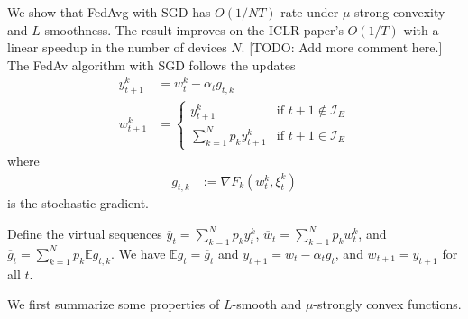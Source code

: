 We show that FedAvg with SGD has $O(1/NT)$ rate under $\mu$-strong
convexity and $L$-smoothness. The result improves on the ICLR paper's
$O(1/T)$ with a linear speedup in the number of devices $N$. {[}TODO:
Add more comment here.{]} The FedAv algorithm with SGD follows the
updates
\begin{align*}
y_{t+1}^{k} & =w_{t}^{k}-\alpha_{t}g_{t,k}\\
w_{t+1}^{k} & =\begin{cases}
y_{t+1}^{k} & \text{if }t+1\notin\mathcal{I}_{E}\\
\sum_{k=1}^{N}p_{k}y_{t+1}^{k} & \text{if }t+1\in\mathcal{I}_{E}
\end{cases}
\end{align*}
where 
\begin{align*}
g_{t,k} & :=\nabla F_{k}(w_{t}^{k},\xi_{t}^{k})
\end{align*}
is the stochastic gradient. 

Define the virtual sequences $\overline{y}_{t}=\sum_{k=1}^{N}p_{k}y_{t}^{k}$,
$\overline{w}_{t}=\sum_{k=1}^{N}p_{k}w_{t}^{k}$, and $\overline{g}_{t}=\sum_{k=1}^{N}p_{k}\mathbb{E}g_{t,k}$.
We have $\mathbb{E}g_{t}=\overline{g}_{t}$ and $\overline{y}_{t+1}=\overline{w}_{t}-\alpha_{t}g_{t}$,
and $\overline{w}_{t+1}=\overline{y}_{t+1}$ for all $t$. 

We first summarize some properties of $L$-smooth and $\mu$-strongly
convex functions. 

